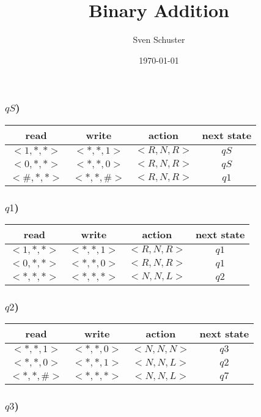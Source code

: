 \documentclass{article}
\begin{document}
\title{Binary Addition}
\author{Sven Schuster}
\date{\today}
\maketitle

\subsubsection*{$qS$)}

\begin{longtable}{c|c|c|c}
read & write & action & next state\\
\hline
$<1,*,*>$ & $<*,*,1>$ & $<R,N,R>$ & $qS$\\
$<0,*,*>$ & $<*,*,0>$ & $<R,N,R>$ & $qS$\\
$<\#,*,*>$ & $<*,*,\#>$ & $<R,N,R>$ & $q1$\\
\end{longtable}

\subsubsection*{$q1$)}

\begin{longtable}{c|c|c|c}
read & write & action & next state\\
\hline
$<1,*,*>$ & $<*,*,1>$ & $<R,N,R>$ & $q1$\\
$<0,*,*>$ & $<*,*,0>$ & $<R,N,R>$ & $q1$\\
$<*,*,*>$ & $<*,*,*>$ & $<N,N,L>$ & $q2$\\
\end{longtable}

\subsubsection*{$q2$)}

\begin{longtable}{c|c|c|c}
read & write & action & next state\\
\hline
$<*,*,1>$ & $<*,*,0>$ & $<N,N,N>$ & $q3$\\
$<*,*,0>$ & $<*,*,1>$ & $<N,N,L>$ & $q2$\\
$<*,*,\#>$ & $<*,*,*>$ & $<N,N,L>$ & $q7$\\
\end{longtable}

\subsubsection*{$q3$)}
\end{document}
